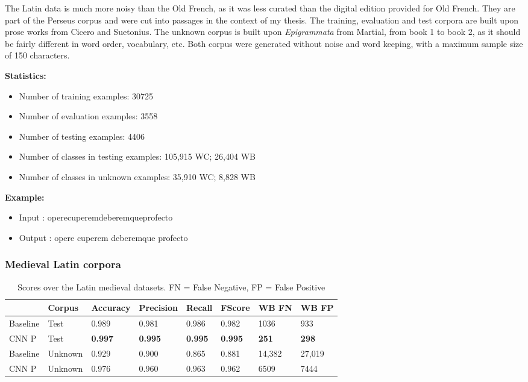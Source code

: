 \documentclass{jdmdh}
\begin{document}
The Latin data is much more noisy than the Old French, as it was less curated than the digital edition provided for Old French. They are part of the Perseus corpus \citet{perseus} and were cut into passages in the context of my thesis. The training, evaluation and test corpora are built upon prose works from Cicero and Suetonius. The unknown corpus is built upon \textit{Epigrammata} from Martial, from book 1 to book 2, as it should be fairly different in word order, vocabulary, etc. Both corpus were generated without noise and word keeping, with a maximum sample size of 150 characters.

\textbf{Statistics:}
\begin{itemize}
\item Number of training examples: 30725
\item Number of evaluation examples: 3558
\item Number of testing examples: 4406
\item Number of classes in testing examples: 105,915 WC; 26,404 WB
\item Number of classes in unknown examples: 35,910 WC; 8,828 WB
\end{itemize}

\textbf{Example:}

\begin{itemize}
    \item Input : operecuperemdeberemqueprofecto
    \item Output : opere cuperem deberemque profecto

\end{itemize}

\subsubsection{Medieval Latin corpora}

\begin{table}[H]
\centering
\begin{tabular}{llllllll}
\hline
 & Corpus & Accuracy & Precision & Recall & FScore & WB FN & WB FP \\ \hline
Baseline & Test & 0.989 & 0.981 & 0.986 & 0.982 & 1036 & 933 \\
CNN P & Test & \textbf{0.997} & \textbf{0.995} & \textbf{0.995} & \textbf{0.995} & \textbf{251} & \textbf{298} \\ \hline
Baseline & Unknown & 0.929 & 0.900 & 0.865 & 0.881 & 14,382 & 27,019 \\
CNN P & Unknown & 0.976 & 0.960 & 0.963 & 0.962 & 6509 & 7444\\ \hline
\end{tabular}
\caption{Scores over the Latin medieval datasets. FN = False Negative, FP = False Positive}
\label{tab:medieval_latin_corpora}
\end{table}
\end{document}
